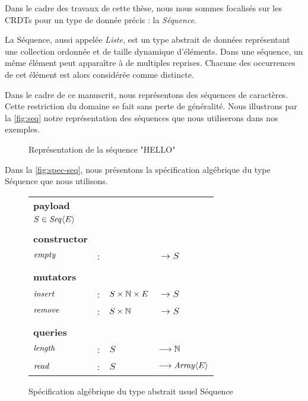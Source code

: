 \label{sec:seq-crdts}

Dans le cadre des travaux de cette thèse, nous nous sommes focalisés sur les \acp{CRDT} pour un type de donnée précis : la \emph{Séquence}.

La Séquence, aussi appelée \emph{Liste}, est un type abstrait de données représentant une collection ordonnée et de taille dynamique d'éléments.
Dans une séquence, un même élément peut apparaître à de multiples reprises.
Chacune des occurrences de cet élément est alors considérée comme distincte.

Dans le cadre de ce manuscrit, nous représentons des séquences de caractères.
Cette restriction du domaine se fait sans perte de généralité.
Nous illustrons par la \autoref{fig:seq} notre représentation des séquences que nous utiliserons dans nos exemples.

\begin{figure}[!ht]

  \centering
  \caption{Représentation de la séquence "HELLO"}
  \label{fig:seq}
\end{figure}

Dans la \autoref{fig:spec-seq}, nous présentons la spécification algébrique du type Séquence que nous utilisons.

\begin{figure}[!ht]

  \centering
    \begin{tabular}{llll}
      \textbf{payload} \\
      $S \in \mathit{Seq}\langle E \rangle$ & & & \\
      \\
      \textbf{constructor} \\
      $\mathit{empty}$ & : &                       & $\longrightarrow S$   \\
      \\
      \textbf{mutators} \\
      $\mathit{insert}$ & : & $S \times \mathbb{N} \times E$ & $\longrightarrow S$   \\
      $\mathit{remove}$ & : & $S \times \mathbb{N}$          & $\longrightarrow S$   \\
      \\
      \textbf{queries} \\
      $\mathit{length}$ & : & $S$                   & $\longrightarrow \mathbb{N}$   \\
      $\mathit{read}$  & : & $S$                   & $\longrightarrow \mathit{Array}\langle E \rangle$ \\
    \end{tabular}
  \caption{Spécification algébrique du type abstrait usuel Séquence}
  \label{fig:spec-seq}
\end{figure}


